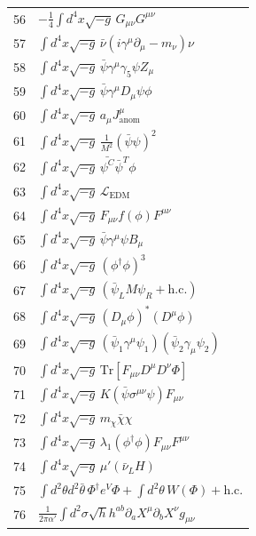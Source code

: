 \documentclass[12pt,a4paper]{article}
\begin{document}
\begin{longtable}{r p{}}
		56 & \(\displaystyle -\frac14\int d^4x\sqrt{-g}\,G_{\mu\nu}G^{\mu\nu}\) \\
		57 & \(\displaystyle \int d^4x\sqrt{-g}\,\bar\nu(i\gamma^\mu\partial_\mu - m_\nu)\nu\) \\
		58 & \(\displaystyle \int d^4x\sqrt{-g}\,\bar\psi\gamma^\mu\gamma_5\psi Z_\mu\) \\
		59 & \(\displaystyle \int d^4x\sqrt{-g}\,\bar\psi\gamma^\mu D_\mu\psi\phi\) \\
		60 & \(\displaystyle \int d^4x\sqrt{-g}\,a_\mu J^\mu_{\text{anom}}\) \\
		61 & \(\displaystyle \int d^4x\sqrt{-g}\,\frac{1}{M^2}(\bar\psi\psi)^2\) \\
		62 & \(\displaystyle \int d^4x\sqrt{-g}\,\bar{\psi^C}\bar{\psi}^T\phi\) \\
		63 & \(\displaystyle \int d^4x\sqrt{-g}\,\mathcal{L}_{\text{EDM}}\) \\
		64 & \(\displaystyle \int d^4x\sqrt{-g}\,F_{\mu\nu}f(\phi)F^{\mu\nu}\) \\
		65 & \(\displaystyle \int d^4x\sqrt{-g}\,\bar\psi\gamma^\mu\psi B_\mu\) \\
		66 & \(\displaystyle \int d^4x\sqrt{-g}\,(\phi^\dagger\phi)^3\) \\
		67 & \(\displaystyle \int d^4x\sqrt{-g}\,(\bar\psi_L M \psi_R + \text{h.c.})\) \\
		68 & \(\displaystyle \int d^4x\sqrt{-g}\,(D_\mu\phi)^*(D^\mu\phi)\) \\
		69 & \(\displaystyle \int d^4x\sqrt{-g}\,(\bar\psi_1\gamma^\mu\psi_1)(\bar\psi_2\gamma_\mu\psi_2)\) \\
		70 & \(\displaystyle \int d^4x\sqrt{-g}\,\mathrm{Tr}[F_{\mu\nu}D^\mu D^\nu\Phi]\) \\
		71 & \(\displaystyle \int d^4x\sqrt{-g}\,K(\bar\psi\sigma^{\mu\nu}\psi)F_{\mu\nu}\) \\
		72 & \(\displaystyle \int d^4x\sqrt{-g}\,m_\chi\bar\chi\chi\) \\
		73 & \(\displaystyle \int d^4x\sqrt{-g}\,\lambda_1(\phi^\dagger\phi)F_{\mu\nu}F^{\mu\nu}\) \\
		74 & \(\displaystyle \int d^4x\sqrt{-g}\,\mu'(\bar\nu_L H)\) \\
		75 & \(\displaystyle \int d^2\theta d^2\bar\theta\,\Phi^\dagger e^V\Phi + \int d^2\theta\,W(\Phi) + \text{h.c.}\) \\
		76 & \(\displaystyle \frac{1}{2\pi\alpha'}\int d^2\sigma\sqrt{h}h^{ab}\partial_a X^\mu\partial_b X^\nu g_{\mu\nu}\) \\

\end{longtable}
\end{document}
